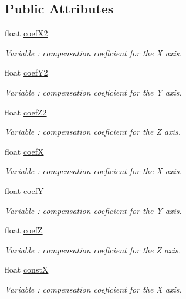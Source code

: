 \subsection*{Public Attributes}
\begin{DoxyCompactItemize}
\item 
float \hyperlink{class_wasp_sensor_parking_a94b63101ce4110a3823c705d8ecf549d}{coef\+X2}
\begin{DoxyCompactList}\small\item\em Variable \+: compensation coeficient for the X axis. \end{DoxyCompactList}\item 
float \hyperlink{class_wasp_sensor_parking_a0b8dc5b606eac7d2a1294d2c2d3388c6}{coef\+Y2}
\begin{DoxyCompactList}\small\item\em Variable \+: compensation coeficient for the Y axis. \end{DoxyCompactList}\item 
float \hyperlink{class_wasp_sensor_parking_a39d3f1d9fc164de3f7fdbaa205de641d}{coef\+Z2}
\begin{DoxyCompactList}\small\item\em Variable \+: compensation coeficient for the Z axis. \end{DoxyCompactList}\item 
float \hyperlink{class_wasp_sensor_parking_ac994717599ea6fc41329bf640d3ac944}{coefX}
\begin{DoxyCompactList}\small\item\em Variable \+: compensation coeficient for the X axis. \end{DoxyCompactList}\item 
float \hyperlink{class_wasp_sensor_parking_a8cca7bd7e2127e65e43a93809d361cbe}{coefY}
\begin{DoxyCompactList}\small\item\em Variable \+: compensation coeficient for the Y axis. \end{DoxyCompactList}\item 
float \hyperlink{class_wasp_sensor_parking_a1d49e5a81bb3f865134f43c41df4a5f2}{coefZ}
\begin{DoxyCompactList}\small\item\em Variable \+: compensation coeficient for the Z axis. \end{DoxyCompactList}\item 
float \hyperlink{class_wasp_sensor_parking_a7aca3e77d76cffce8e58dc8a8eb062cb}{constX}
\begin{DoxyCompactList}\small\item\em Variable \+: compensation coeficient for the X axis. \end{DoxyCompactList}\item 

\end{DoxyCompactItemize}
